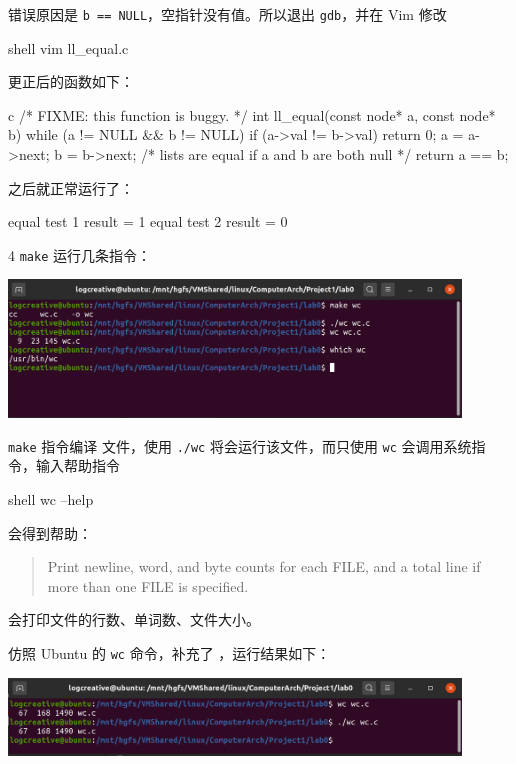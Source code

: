 \documentclass[12pt,a4paper]{article}
\newenvironment{problems}{\begin{list}{}{\renewcommand{\makelabel}[1]{\textbf{##1}.\hfil}}}{\end{list}}
\begin{document}
\begin{problems}
    错误原因是 \texttt{b == NULL}，空指针没有值。所以退出 \texttt{gdb}，并在 Vim 修改
    \begin{code}{shell}
        vim ll_equal.c
    \end{code}

    更正后的函数如下：

    \begin{code}{c}
/* FIXME: this function is buggy. */
int ll_equal(const node* a, const node* b) {
	while (a != NULL && b != NULL) {
		if (a->val != b->val)
			return 0;
		a = a->next;
		b = b->next;
	}
	/* lists are equal if a and b are both null */
	return a == b;
}
    \end{code}

    之后就正常运行了：
    \begin{literal}
equal test 1 result = 1
equal test 2 result = 0
    \end{literal}

    \item[4] \texttt{make}
    运行几条指令：
    
    \includegraphics[width=0.9\textwidth]{make.png}

    \texttt{make} 指令编译  文件，使用 \texttt{./wc} 将会运行该文件，而只使用 \texttt{wc} 会调用系统指令，输入帮助指令
    \begin{code}{shell}
        wc --help
    \end{code}
    会得到帮助：
    \begin{quote}
        Print newline, word, and byte counts for each FILE, and a total line if more than one FILE is specified.
    \end{quote}
    会打印文件的行数、单词数、文件大小。

    仿照 Ubuntu 的 \texttt{wc} 命令，补充了 ，运行结果如下：

    \includegraphics[width=0.9\textwidth]{wc.png}

    \inputminted[breaklines,autogobble,linenos,numbersep=1mm,frame=lines,framesep=2mm,fontsize=\scriptsize,]{c}{../lab0/wc.c}

\end{problems}
\end{document}
